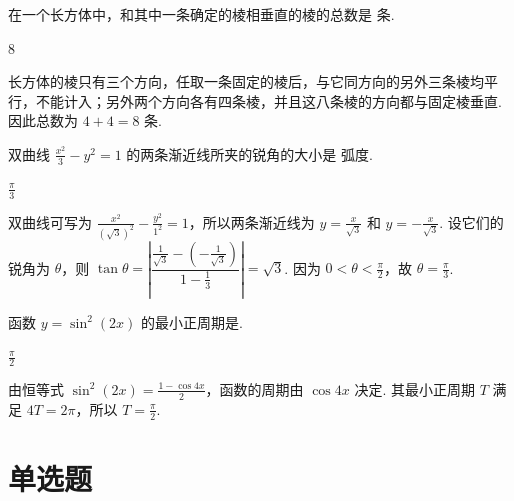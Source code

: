 \begin{problem}

在一个长方体中，和其中一条确定的棱相垂直的棱的总数是\fillinblank{} 条.
\begin{answer}
\(8\)
\end{answer}

\begin{solution}
长方体的棱只有三个方向，任取一条固定的棱后，与它同方向的另外三条棱均平行，不能计入；另外两个方向各有四条棱，并且这八条棱的方向都与固定棱垂直. 因此总数为 \(4+4=8\) 条.
\end{solution}
\end{problem}

\begin{problem}

双曲线 \(\frac{x^2}{3} - y^2 = 1\) 的两条渐近线所夹的锐角的大小是\fillinblank{} 弧度.
\begin{answer}
\(\frac{\pi}{3}\)
\end{answer}

\begin{solution}
双曲线可写为 \(\frac{x^{2}}{(\sqrt3)^{2}}-\frac{y^{2}}{1^{2}}=1\)，所以两条渐近线为 \(y=\frac{x}{\sqrt3}\) 和 \(y=-\frac{x}{\sqrt3}\). 设它们的锐角为 \(\theta\)，则
\(\tan\theta=\left|\dfrac{\frac1{\sqrt3}-(-\frac1{\sqrt3})}{1-\frac13}\right|=\sqrt3\). 因为 \(0<\theta<\frac\pi2\)，故 \(\theta=\frac\pi3\).
\end{solution}
\end{problem}

\begin{problem}

函数 \(y = \sin^{2}(2x) \) 的最小正周期是\fillinblank{}.
\begin{answer}
\(\frac{\pi}{2}\)
\end{answer}

\begin{solution}
由恒等式 \(\sin^{2}(2x)=\frac{1-\cos4x}{2}\)，函数的周期由 \(\cos4x\) 决定. 其最小正周期 \(T\) 满足 \(4T=2\pi\)，所以 \(T=\frac\pi2\).
\end{solution}
\end{problem}

\section{单选题}

